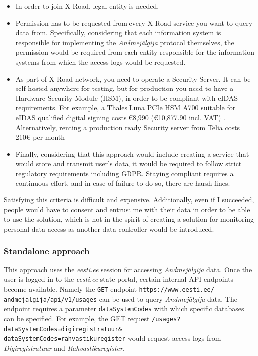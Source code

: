 \begin{itemize}
    \item {In order to join X-Road, legal entity is needed.}
    \item {Permission has to be requested from every X-Road service you want to query data from. Specifically, considering that each information system is responsible for implementing the \textit{Andmejälgija} protocol themselves, the permission would be required from each entity responsible for the information systems from which the access logs would be requested.}
    \item {As part of X-Road network, you need to operate a Security Server. It can be self-hosted anywhere for testing, but for production you need to have a Hardware Security Module (HSM), in order to be compliant with eIDAS requirements. For example, a Thales Luna PCIe HSM A700 suitable for eIDAS qualified digital signing costs €8,990 (€10,877.90 incl. VAT) \cite{thales-luna-hsm-pricing}. Alternatively, renting a production ready Security server from Telia costs 210€ per month \cite{telia-xroad-server}}
    \item {Finally, considering that this approach would include creating a service that would store and transmit user's data, it would be required to follow strict regulatory requirements including GDPR. Staying compliant requires a continuous effort, and in case of failure to do so, there are harsh fines.}
\end{itemize}

Satisfying this criteria is difficult and expensive. Additionally, even if I succeeded, people would have to consent and entrust me with their data in order to be able to use the solution, which is not in the spirit of creating a solution for monitoring personal data access as another data controller would be introduced.

\subsubsection{Standalone approach}
This approach uses the \textit{eesti.ee} session for accessing \textit{Andmejälgija} data. Once the user is logged in to the \textit{eesti.ee} state portal, certain internal API endpoints become available. Namely the \texttt{GET} endpoint \texttt{https://www.eesti.ee/\\andmejalgija/api/v1/usages} can be used to query \textit{Andmejälgija} data. The endpoint requires a parameter \texttt{dataSystemCodes} with which specific databases can be specified. For example, the GET request \texttt{/usages?dataSystemCodes=digiregistratuur\&\\dataSystemCodes=rahvastikuregister} would request access logs from \textit{Digiregistratuur} and \textit{Rahvastikuregister}.

